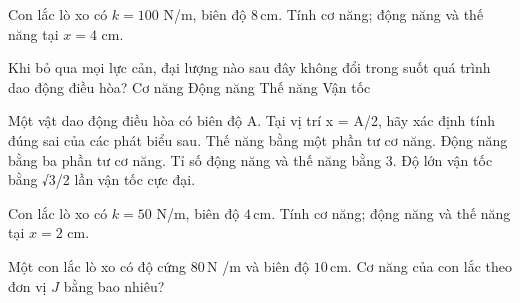 \begin{bt}
Con lắc lò xo có $k=100$ N/m, biên độ $8\,\text{cm}$. Tính cơ năng; động năng và thế năng tại $x=4$ cm.
\end{bt}


\begin{ex}
Khi bỏ qua mọi lực cản, đại lượng nào sau đây không đổi trong suốt quá trình dao động điều hòa?
\choice
{\True Cơ năng}
{Động năng}
{Thế năng}
{Vận tốc}
\end{ex}

\begin{ex}
Một vật dao động điều hòa có biên độ A. Tại vị trí x = A/2, hãy xác định tính đúng sai của các phát biểu sau.
\choiceTF
{\True Thế năng bằng một phần tư cơ năng.}
{\True Động năng bằng ba phần tư cơ năng.}
{\True Tỉ số động năng và thế năng bằng 3.}
{\True Độ lớn vận tốc bằng √3/2 lần vận tốc cực đại.}
\end{ex}

\begin{bt}
Con lắc lò xo có $k=50$ N/m, biên độ $4\,\text{cm}$. Tính cơ năng; động năng và thế năng tại $x=2$ cm.
\end{bt}

\begin{ex}
Một con lắc lò xo có độ cứng $80\,\text{N}$ /m và biên độ $10\,\text{cm}$. Cơ năng của con lắc theo đơn vị $J$ bằng bao nhiêu?
\end{ex}

